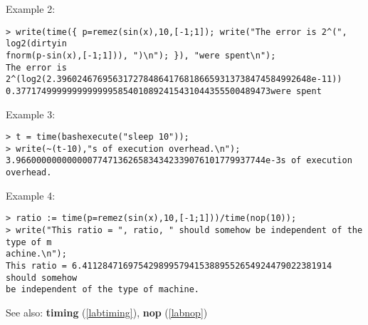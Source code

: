 \noindent Example 2: 
\begin{center}\begin{minipage}{15cm}\begin{Verbatim}[frame=single]
> write(time({ p=remez(sin(x),10,[-1;1]); write("The error is 2^(", log2(dirtyin
fnorm(p-sin(x),[-1;1])), ")\n"); }), "were spent\n");
The error is 2^(log2(2.39602467695631727848641768186659313738474584992648e-11))
0.37717499999999999995854010892415431044355500489473were spent
\end{Verbatim}
\end{minipage}\end{center}
\noindent Example 3: 
\begin{center}\begin{minipage}{15cm}\begin{Verbatim}[frame=single]
> t = time(bashexecute("sleep 10"));
> write(~(t-10),"s of execution overhead.\n");
3.9660000000000007747136265834342339076101779937744e-3s of execution overhead.
\end{Verbatim}
\end{minipage}\end{center}
\noindent Example 4: 
\begin{center}\begin{minipage}{15cm}\begin{Verbatim}[frame=single]
> ratio := time(p=remez(sin(x),10,[-1;1]))/time(nop(10));
> write("This ratio = ", ratio, " should somehow be independent of the type of m
achine.\n");
This ratio = 6.4112847169754298995794153889552654924479022381914 should somehow 
be independent of the type of machine.
\end{Verbatim}
\end{minipage}\end{center}
See also: \textbf{timing} (\ref{labtiming}), \textbf{nop} (\ref{labnop})
